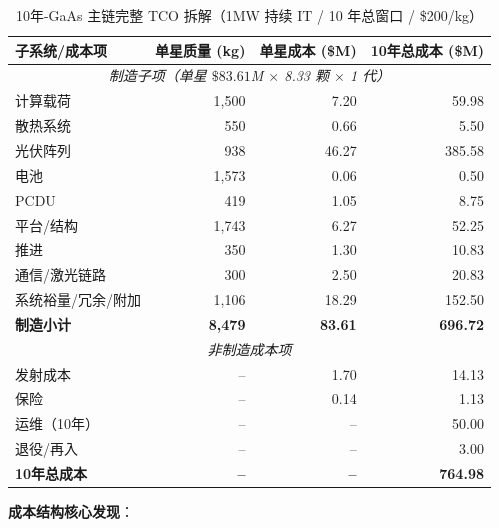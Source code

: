 \begin{table}[H]
\centering
\caption{10年-GaAs 主链完整 TCO 拆解（1\;MW 持续 IT / 10 年总窗口 / \$200/kg）}
\label{tab:gaas10_tco}
\small
\begin{tabular}{p{4.5cm}rrr}
\toprule
\textbf{子系统/成本项} & \textbf{单星质量 (kg)} & \textbf{单星成本 (\$M)} & \textbf{10年总成本 (\$M)} \\
\midrule
\multicolumn{4}{c}{\textit{制造子项（单星 $\$83.61$M $\times$ 8.33 颗 $\times$ 1 代）}} \\
\quad 计算载荷        & 1,500 & 7.20  & 59.98 \\
\quad 散热系统        & 550   & 0.66  & 5.50 \\
\quad 光伏阵列        & 938   & 46.27 & 385.58 \\
\quad 电池            & 1,573 & 0.06  & 0.50 \\
\quad PCDU            & 419   & 1.05  & 8.75 \\
\quad 平台/结构       & 1,743 & 6.27  & 52.25 \\
\quad 推进            & 350   & 1.30  & 10.83 \\
\quad 通信/激光链路   & 300   & 2.50  & 20.83 \\
\quad 系统裕量/冗余/附加   & 1,106 & 18.29 & 152.50 \\
\midrule
\textbf{制造小计}     & \textbf{8,479} & \textbf{83.61} & \textbf{696.72} \\
\midrule
\multicolumn{4}{c}{\textit{非制造成本项}} \\
\quad 发射成本        & -- & 1.70  & 14.13 \\
\quad 保险            & -- & 0.14  & 1.13 \\
\quad 运维（10年）    & -- & --    & 50.00 \\
\quad 退役/再入       & -- & --    & 3.00 \\
\midrule
\textbf{10年总成本}   & \textbf{--} & \textbf{--} & \textbf{764.98} \\
\bottomrule
\end{tabular}
\end{table}

\textbf{成本结构核心发现}：

